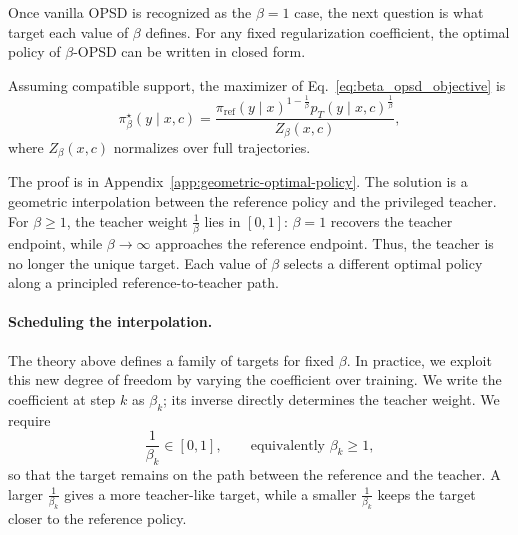 Once vanilla OPSD is recognized as the $\beta=1$ case, the next question is what target
each value of $\beta$ defines. For any fixed regularization coefficient, the optimal policy of
$\beta$-OPSD can be written in closed form.

\begin{proposition}
\label{prop:geometric_optimal_policy}
Assuming compatible support, the maximizer of Eq.~\ref{eq:beta_opsd_objective} is
\begin{equation}
    \pi_{\beta}^{\star}(y\mid x,c)
    =
    \frac{
    \pi_{\mathrm{ref}}(y\mid x)^{1-\frac{1}{\beta}}
    p_T(y\mid x,c)^{\frac{1}{\beta}}
    }{
    Z_{\beta}(x,c)
    },
    \label{eq:sequence_geometric_mixture}
\end{equation}
where $Z_{\beta}(x,c)$ normalizes over full trajectories.
\end{proposition}

The proof is in Appendix~\ref{app:geometric-optimal-policy}. The solution is a geometric
interpolation between the reference policy and the privileged teacher. For $\beta\ge 1$, the
teacher weight $\frac{1}{\beta}$ lies in $[0,1]$: $\beta=1$ recovers the teacher endpoint,
while $\beta\to\infty$ approaches the reference endpoint. Thus, the teacher is no longer
the unique target. Each value of $\beta$ selects a different optimal policy along a principled
reference-to-teacher path.

\paragraph{Scheduling the interpolation.}
The theory above defines a family of targets for fixed $\beta$. In practice, we exploit this
new degree of freedom by varying the coefficient over training. We write the coefficient at
step $k$ as $\beta_k$; its inverse directly determines the teacher weight. We require
\begin{equation}
    \frac{1}{\beta_k}\in[0,1],
    \qquad
    \text{equivalently } \beta_k\ge 1,
\end{equation}
so that the target remains on the path between the reference and the teacher. A larger
$\frac{1}{\beta_k}$ gives a more teacher-like target, while a smaller
$\frac{1}{\beta_k}$ keeps the target closer to the reference policy.

